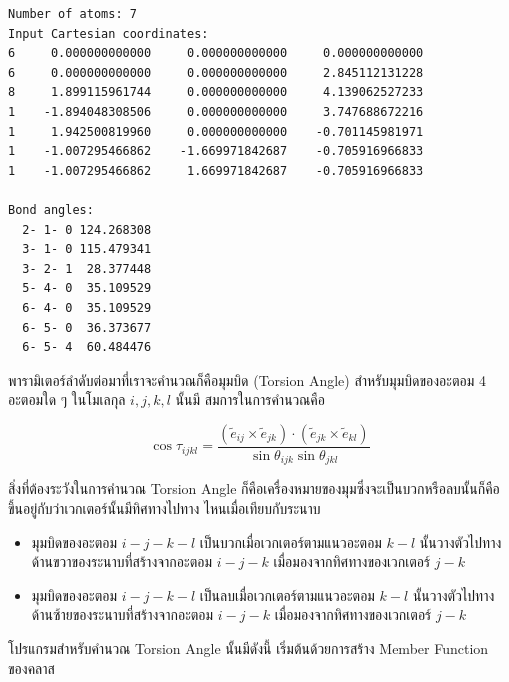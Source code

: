 \begin{lstlisting}
Number of atoms: 7
Input Cartesian coordinates:
6     0.000000000000     0.000000000000     0.000000000000
6     0.000000000000     0.000000000000     2.845112131228
8     1.899115961744     0.000000000000     4.139062527233
1    -1.894048308506     0.000000000000     3.747688672216
1     1.942500819960     0.000000000000    -0.701145981971
1    -1.007295466862    -1.669971842687    -0.705916966833
1    -1.007295466862     1.669971842687    -0.705916966833

Bond angles:
  2- 1- 0 124.268308
  3- 1- 0 115.479341
  3- 2- 1  28.377448
  5- 4- 0  35.109529
  6- 4- 0  35.109529
  6- 5- 0  36.373677
  6- 5- 4  60.484476
\end{lstlisting}

\vspace{5pt}

\noindent {}

พารามิเตอร์ลำดับต่อมาที่เราจะคำนวณก็คือมุมบิด (Torsion Angle) สำหรับมุมบิดของอะตอม 4 อะตอมใด ๆ ในโมเลกุล $i, j, k, l$ นั้นมี%
สมการในการคำนวณคือ

\begin{equation}
  \cos \tau_{ijkl}
  =
  \frac{
    (\tilde{e}_{ij} \times \tilde{e}_{jk})
    \cdot
    (\tilde{e}_{jk} \times \tilde{e}_{kl})
  }
  {
    \sin \theta_{ijk}
    \sin \theta_{jkl}
  }
\end{equation}

\noindent สิ่งที่ต้องระวังในการคำนวณ Torsion Angle ก็คือเครื่องหมายของมุมซึ่งจะเป็นบวกหรือลบนั้นก็คือขึ้นอยู่กับว่าเวกเตอร์นั้นมีทิศทางไปทาง%
ไหนเมื่อเทียบกับระนาบ

\begin{itemize}
  \item มุมบิดของอะตอม $i-j-k-l$ เป็นบวกเมื่อเวกเตอร์ตามแนวอะตอม $k-l$ นั้นวางตัวไปทางด้านขวาของระนาบที่สร้างจากอะตอม $i-j-k$
        เมื่อมองจากทิศทางของเวกเตอร์ $j-k$

  \item มุมบิดของอะตอม $i-j-k-l$ เป็นลบเมื่อเวกเตอร์ตามแนวอะตอม $k-l$ นั้นวางตัวไปทางด้านซ้ายของระนาบที่สร้างจากอะตอม $i-j-k$
        เมื่อมองจากทิศทางของเวกเตอร์ $j-k$
\end{itemize}

\vspace{5pt}

โปรแกรมสำหรับคำนวณ Torsion Angle นั้นมีดังนี้ เริ่มต้นด้วยการสร้าง Member Function ของคลาส 

